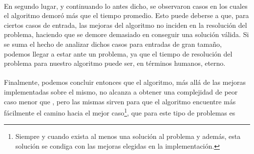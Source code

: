 \paragraph{}
En segundo lugar, y continuando lo antes dicho, se observaron casos en los cuales el algoritmo demoró más que el tiempo promedio. Esto puede deberse a que, para ciertos casos de entrada, las mejoras del algoritmo no inciden en la resolución del problema, haciendo que se demore demasiado en conseguir una solución válida. Si se suma el hecho de analizar dichos casos para entradas de gran tamaño, podemos llegar a estar ante un problema, ya que el tiempo de resolución del problema para nuestro algoritmo puede ser, en términos humanos, eterno.

\paragraph{}
Finalmente, podemos concluir entonces que el algoritmo, más allá de las mejoras implementadas sobre el mismo, no alcanza a obtener una complejidad de peor caso menor que , pero las mismas sirven para que el algoritmo encuentre más fácilmente el camino hacia el mejor caso\footnote{Siempre y cuando exista al menos una solución al problema y además, esta solución se condiga con las mejoras elegidas en la implementación.}, que para este tipo de problemas es 